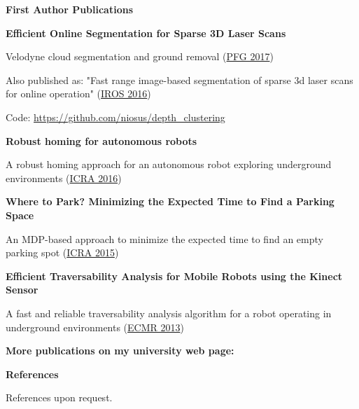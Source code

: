 \documentclass[a4paper,12pt,final]{memoir}
\newcommand{\SmallSep}{\vspace{0.5em}}
\newcommand{\CVSection}[1]
	{\Large\textbf{#1}\par
	\SmallSep\normalsize\normalfont}
\newcommand{\CVItem}[1]
	{\textbf{\color{MidnightBlue} #1}}
\begin{document}
\CVSection{First Author Publications}
\CVItem{Efficient Online Segmentation for Sparse 3D Laser Scans}
\begin{compactitem}[\color{MidnightBlue}$\circ$]
	\item Velodyne cloud segmentation and ground removal (\href{https://link.springer.com/article/10.1007/s41064-016-0003-y}{PFG 2017})
	\item Also published as: "Fast range image-based segmentation of sparse 3d
	laser scans for online operation" (\href{http://iros2016.org/}{IROS 2016})
	\item Code: \href{https://github.com/niosus/depth_clustering}{https://github.com/niosus/depth\_clustering}
\end{compactitem}
\CVItem{Robust homing for autonomous robots}
\begin{compactitem}[\color{MidnightBlue}$\circ$]
	\item A robust homing approach for an autonomous robot exploring underground
	environments (\href{http://icra2016.org/}{ICRA 2016})
\end{compactitem}
\CVItem{Where to Park? Minimizing the Expected Time to Find a Parking Space}
\begin{compactitem}[\color{MidnightBlue}$\circ$]
	\item An MDP-based approach to minimize the expected time to find an empty
	parking spot (\href{http://icra2015.org/}{ICRA 2015})
\end{compactitem}
\CVItem{Efficient Traversability Analysis for Mobile Robots using the Kinect Sensor}
\begin{compactitem}[\color{MidnightBlue}$\circ$]
	\item A fast and reliable traversability analysis algorithm for a robot
	operating in underground environments
	(\href{http://www.iri.upc.edu/ecmr13/#home}{ECMR 2013})
\end{compactitem}
\CVItem{More publications on my university web page:}
\SmallSep

\vfill
\CVSection{References}
	References upon request.
\clearpage
\framebreak

\end{document}
